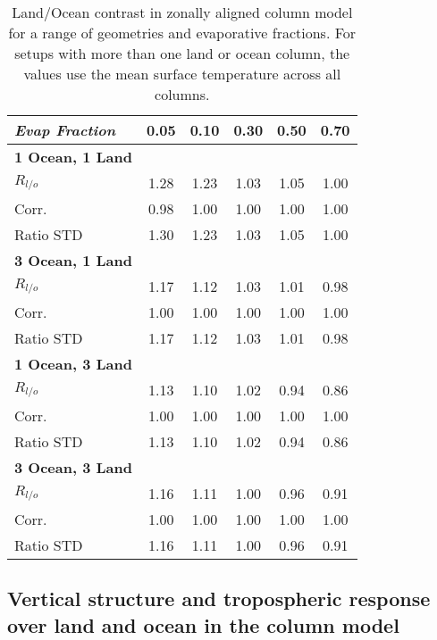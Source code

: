 \begin{center}
	\begin{table}[ht]
		\caption{Land/Ocean contrast in zonally aligned column model for a range 
		of geometries and evaporative fractions. For setups with more than one 
	land or ocean column, the values use the mean surface temperature across all 
columns.}
		\label{tab:tdm_Rlo}
		\scriptsize
	\begin{tabular}{ l  c  c  c  c  c }
		\hline
		\textit{Evap Fraction}	& 0.05  & 0.10 & 0.30  & 0.50  & 0.70 \\ \hline
		\textbf{1 Ocean, 1 Land}\\
		$R_{l/o}$ 					& 1.28  & 1.23 & 1.03  & 1.05 & 1.00\\ 
		Corr.					& 0.98  & 1.00 & 1.00  & 1.00 & 1.00\\ %
		Ratio STD          		& 1.30  & 1.23 & 1.03  & 1.05 & 1.00\\ \hline
		\textbf{3 Ocean, 1 Land}\\
		$R_{l/o}$ 					& 1.17  & 1.12 & 1.03  & 1.01 & 0.98\\ %
		Corr.					& 1.00  & 1.00 & 1.00  & 1.00 & 1.00\\ %
		Ratio STD          		& 1.17  & 1.12 & 1.03  & 1.01 & 0.98\\ \hline
		\textbf{1 Ocean, 3 Land}\\
		$R_{l/o}$ 					& 1.13  & 1.10 & 1.02  & 0.94 & 0.86\\ %
		Corr.					& 1.00  & 1.00 & 1.00  & 1.00 & 1.00\\ %
		Ratio STD          		& 1.13  & 1.10 & 1.02  & 0.94 & 0.86\\ \hline
		\textbf{3 Ocean, 3 Land}\\
		$R_{l/o}$ 					& 1.16  & 1.11 & 1.00  & 0.96 & 0.91\\ %
		Corr.					& 1.00  & 1.00 & 1.00  & 1.00 & 1.00\\ %
		Ratio STD          		& 1.16  & 1.11 & 1.00  & 0.96 & 0.91\\ \hline
	\end{tabular}
	\end{table}
\end{center}

\subsection{Vertical structure and tropospheric response over land and ocean in 
the column model}
\label{sec:mcm_linreg_plev}

